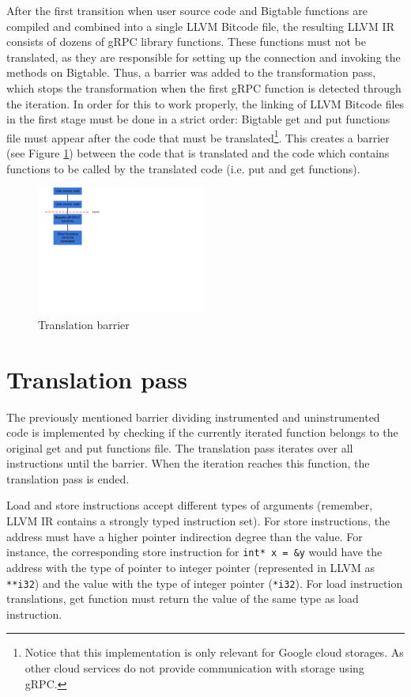 \documentclass[bsc,frontabs,twoside,singlespacing,parskip,deptreport]{infthesis}     %
\begin{document}
After the first transition when user source code and Bigtable functions are compiled and combined into a single LLVM Bitcode file, the resulting LLVM IR consists of dozens of gRPC library functions. These functions must not be translated, as they are responsible for setting up the connection and invoking the methods on Bigtable. Thus, a barrier was added to the transformation pass, which stops the transformation when the first gRPC function is detected through the iteration. In order for this to work properly, the linking of LLVM Bitcode files in the first stage must be done in a strict order: Bigtable get and put functions file must appear after the code that must be translated\footnote{Notice that this implementation is only relevant for Google cloud storages. As other cloud services do not provide communication with storage using gRPC.}. This creates a barrier (see Figure \ref{fig:barrier}) between the code that is translated and the code which contains functions to be called by the translated code (i.e. put and get functions).

\begin{figure}[H]
\centering
\includegraphics[width=0.5\textwidth]{images/barrier}
\caption{Translation barrier}
\label{fig:barrier}
\end{figure}


\section{Translation pass}

The previously mentioned barrier dividing instrumented and uninstrumented code is implemented by checking if the currently iterated function belongs to the original get and put functions file. The translation pass iterates over all instructions until the barrier. When the iteration reaches this function, the translation pass is ended.

Load and store instructions accept different types of arguments (remember, LLVM IR contains a strongly typed instruction set). For store instructions, the address must have a higher pointer indirection degree than the value. For instance, the corresponding store instruction for \texttt{int* x = &y} would have the address with the type of pointer to integer pointer (represented in LLVM as \texttt{**i32}) and the value with the type of integer pointer (\texttt{*i32}). For load instruction translations, get function must return the value of the same type as load instruction. 
\end{document}

